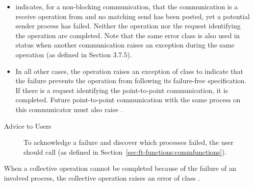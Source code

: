 \begin{itemize}

\item {} indicates, for a non-blocking communication,
   that the communication is a receive operation from 
    and no matching send has been posted, yet 
    a potential sender process has failed. Neither the operation nor 
    the request identifying the operation are completed. Note that the
    same error class is also used in status when another communication
    raises an exception during the same operation (as defined in 
    Section 3.7.5).
	
\item In all other cases, the operation raises an exception of class
     to indicate that the failure prevents the
    operation from following its failure-free specification. If there is a
    request identifying the point-to-point communication, it is completed.
    Future point-to-point communication with the same process on this 
    communicator must also raise .

\end{itemize}

\begin{description}

\item[Advice to Users] {To acknowledge a failure and discover which processes failed, the user should
call  (as defined in
Section~\ref{sec:ft-functions:commfunctions}).}

\end{description}

When a collective operation cannot be completed because of the failure of
an involved process, the collective operation raises an error of class 
. 

